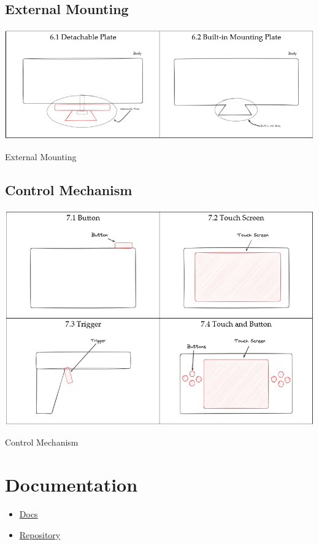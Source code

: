 \subsection{External Mounting}
\begin{table}[H]
    \centering
    \includegraphics[width=\linewidth]{texs/Part1/chapter3/image/s6.png}
    \caption{External Mounting}
    \label{tab:external-mounting}
\end{table}

\subsection{Control Mechanism}
\begin{table}[H]
    \centering
    \includegraphics[width=\linewidth]{texs/Part1/chapter3/image/s7.png}
    \caption{Control Mechanism}
    \label{tab:control-mechanism}
\end{table}

\section{Documentation}

\begin{itemize}
    \item \href{https://haziqsabtu.github.io/SpeedCameraPi/}{Docs}
    \item \href{https://github.com/HaziqSabtu/SpeedCameraPi}{Repository}
\end{itemize}

